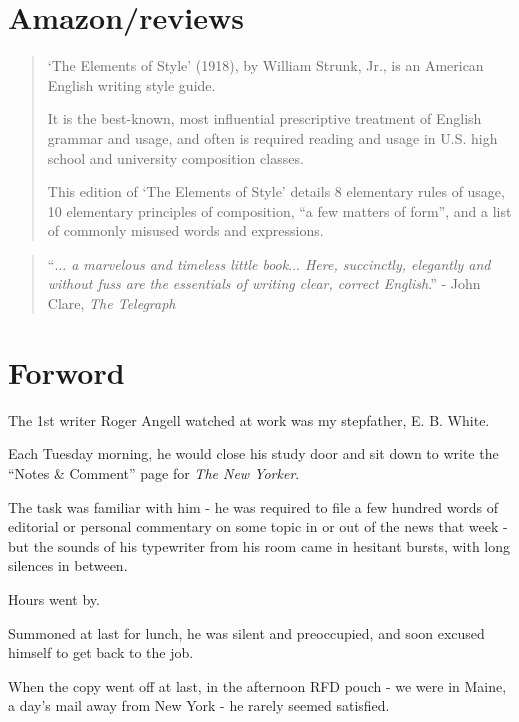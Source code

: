 \documentclass{article}
\begin{document}

\section*{Amazon/reviews}
\begin{quotation}
	`The Elements of Style' (1918), by William Strunk, Jr., is an American English writing style guide.
	
	It is the best-known, most influential prescriptive treatment of English grammar and usage, and often is required reading and usage in U.S. high school and university composition classes.
	
	This edition of `The Elements of Style' details 8 elementary rules of usage, 10 elementary principles of composition, ``a few matters of form'', and a list of commonly misused words and expressions.
\end{quotation}

\begin{quotation}
	``{\it $\ldots$ a marvelous and timeless little book$\ldots$ Here, succinctly, elegantly and without fuss are the essentials of writing clear, correct English}.'' - John Clare, {\it The Telegraph}
\end{quotation}


\section*{Forword}

The 1st writer Roger Angell watched at work was my stepfather, E. B. White.

Each Tuesday morning, he would close his study door and sit down to write the ``Notes \& Comment'' page for {\it The New Yorker}.

The task was familiar with him - he was required to file a few hundred words of editorial or personal commentary on some topic in or out of the news that week - but the sounds of his typewriter from his room came in hesitant bursts, with long silences in between.

Hours went by.

Summoned at last for lunch, he was silent and preoccupied, and soon excused himself to get back to the job.

When the copy went off at last, in the afternoon RFD pouch - we were in Maine, a day's mail away from New York - he rarely seemed satisfied.
\end{document}
